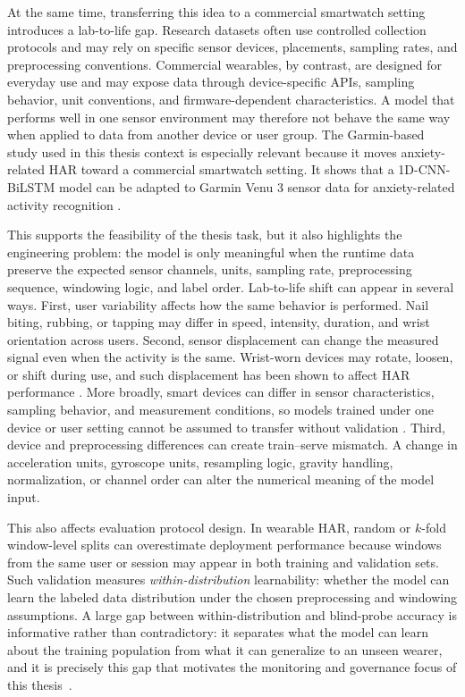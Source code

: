 At the same time, transferring this idea to a commercial smartwatch setting introduces a lab-to-life gap. Research datasets often use controlled collection protocols and may rely on specific sensor devices, placements, sampling rates, and preprocessing conventions. Commercial wearables, by contrast, are designed for everyday use and may expose data through device-specific APIs, sampling behavior, unit conventions, and firmware-dependent characteristics. A model that performs well in one sensor environment may therefore not behave the same way when applied to data from another device or user group. The Garmin-based study used in this thesis context is especially relevant because it moves anxiety-related HAR toward a commercial smartwatch setting. It shows that a 1D-CNN-BiLSTM model can be adapted to Garmin Venu 3 sensor data for anxiety-related activity recognition \cite{oleh2025recognition}.

This supports the feasibility of the thesis task, but it also highlights the engineering problem: the model is only meaningful when the runtime data preserve the expected sensor channels, units, sampling rate, preprocessing sequence, windowing logic, and label order. Lab-to-life shift can appear in several ways. First, user variability affects how the same behavior is performed. Nail biting, rubbing, or tapping may differ in speed, intensity, duration, and wrist orientation across users. Second, sensor displacement can change the measured signal even when the activity is the same. Wrist-worn devices may rotate, loosen, or shift during use, and such displacement has been shown to affect HAR performance \cite{wang2024enhancing}. More broadly, smart devices can differ in sensor characteristics, sampling behavior, and measurement conditions, so models trained under one device or user setting cannot be assumed to transfer without validation \cite{stisen2015smart}. Third, device and preprocessing differences can create train--serve mismatch. A change in acceleration units, gyroscope units, resampling logic, gravity handling, normalization, or channel order can alter the numerical meaning of the model input.

This also affects evaluation protocol design. In wearable HAR, random or \(k\)-fold window-level splits can overestimate deployment performance because windows from the same user or session may appear in both training and validation sets. Such validation measures \emph{within-distribution} learnability: whether the model can learn the labeled data distribution under the chosen preprocessing and windowing assumptions. A large gap between within-distribution and blind-probe accuracy is informative rather than contradictory: it separates what the model can learn about the training population from what it can generalize to an unseen wearer, and it is precisely this gap that motivates the monitoring and governance focus of this thesis~\cite{hammerla2016deep,bulling2014tutorial,reiss2012pamap}.


